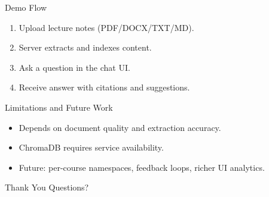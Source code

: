 \documentclass[aspectratio=169]{beamer}
\begin{document}
\begin{frame}{Demo Flow}
  \begin{enumerate}
    \item Upload lecture notes (PDF/DOCX/TXT/MD).
    \item Server extracts and indexes content.
    \item Ask a question in the chat UI.
    \item Receive answer with citations and suggestions.
  \end{enumerate}
\end{frame}

\begin{frame}{Limitations and Future Work}
  \begin{itemize}
    \item Depends on document quality and extraction accuracy.
    \item ChromaDB requires service availability.
    \item Future: per-course namespaces, feedback loops, richer UI analytics.
  \end{itemize}
\end{frame}

\begin{frame}{Thank You}
  \centering
  Questions?
\end{frame}
\end{document}
